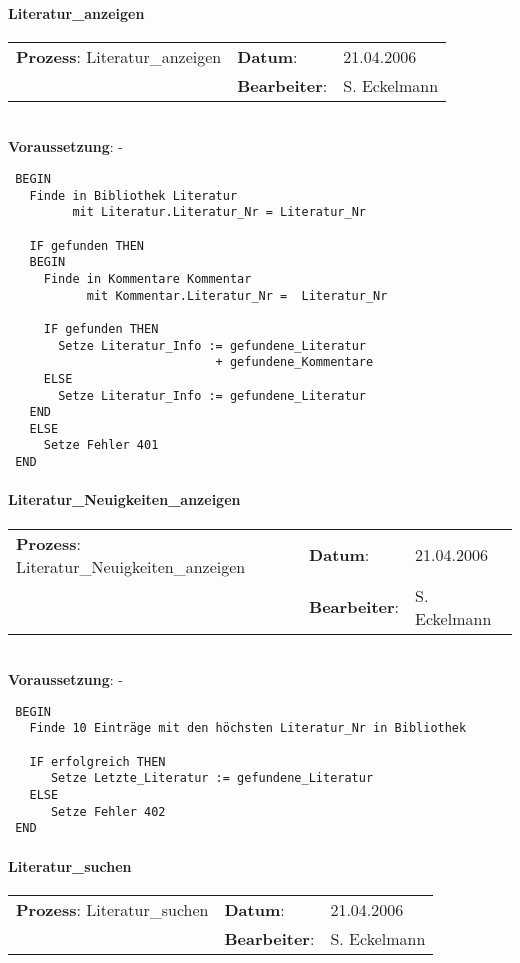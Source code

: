 \paragraph{Literatur\_anzeigen}
\begin{tabular}[t]{p{9.5cm}ll}
\textbf{Prozess}: Literatur\_anzeigen  	&\textbf{Datum}:      &21.04.2006\\
					&\textbf{Bearbeiter}: &S. Eckelmann\\
\end{tabular}

\hrulefill\\
\textbf{Voraussetzung}: -
\begin{verbatim}
 BEGIN
   Finde in Bibliothek Literatur
         mit Literatur.Literatur_Nr = Literatur_Nr

   IF gefunden THEN
   BEGIN
     Finde in Kommentare Kommentar
           mit Kommentar.Literatur_Nr =  Literatur_Nr

     IF gefunden THEN
       Setze Literatur_Info := gefundene_Literatur
                             + gefundene_Kommentare
     ELSE
       Setze Literatur_Info := gefundene_Literatur
   END
   ELSE
     Setze Fehler 401
 END
\end{verbatim}
\hrulefill

\paragraph{Literatur\_Neuigkeiten\_anzeigen}
\begin{tabular}[t]{p{9.5cm}ll}
\textbf{Prozess}: Literatur\_Neuigkeiten\_anzeigen  	&\textbf{Datum}:      &21.04.2006\\
					&\textbf{Bearbeiter}: &S. Eckelmann\\
\end{tabular}

\hrulefill\\
\textbf{Voraussetzung}: -
\begin{verbatim}
 BEGIN
   Finde 10 Einträge mit den höchsten Literatur_Nr in Bibliothek

   IF erfolgreich THEN
      Setze Letzte_Literatur := gefundene_Literatur
   ELSE
      Setze Fehler 402
 END
\end{verbatim}
\hrulefill


\paragraph{Literatur\_suchen}
\begin{tabular}[t]{p{9.5cm}ll}
\textbf{Prozess}: Literatur\_suchen  	&\textbf{Datum}:      &21.04.2006\\
					&\textbf{Bearbeiter}: &S. Eckelmann\\
\end{tabular}

